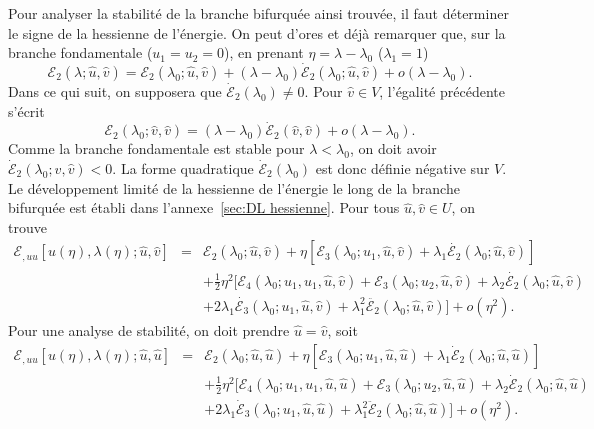 \documentclass{article}
\newcommand{\nobracket}{}
\newcommand{\nocomma}{}
\newcommand{\nosymbol}{}
\begin{document}
Pour analyser la stabilit{\'e} de la branche bifurqu{\'e}e ainsi trouv{\'e}e,
il faut d{\'e}terminer le signe de la hessienne de l'{\'e}nergie. On peut
d'ores et d{\'e}j{\`a} remarquer que, sur la branche fondamentale ($u_1 = u_2
= 0$), en prenant $\eta = \lambda - \lambda_0$ ($\lambda_1 = 1$)
\begin{equation}
  \mathcal{E}_2 (\lambda ; \hat{u}, \hat{v}) =\mathcal{E}_2 (\lambda_0 ;
  \hat{u}, \hat{v}) + (\lambda - \lambda_0)  \dot{\mathcal{E}}_2 (\lambda_0 ;
  \hat{u}, \hat{v}) + o (\lambda - \lambda_0) .
\end{equation}
Dans ce qui suit, on supposera que $\dot{\mathcal{E}}_2 (\lambda_0) \neq 0$.
Pour $\hat{v} \in V$, l'{\'e}galit{\'e} pr{\'e}c{\'e}dente s'{\'e}crit
\begin{equation}
  \mathcal{E}_2 (\lambda_0 ; \hat{v}, \hat{v}) = (\lambda - \lambda_0)
  \dot{\mathcal{E}}_2 (\hat{v}, \hat{v}) + o (\lambda - \lambda_0) .
\end{equation}
Comme la branche fondamentale est stable pour $\lambda < \lambda_0$, on doit
avoir $\dot{\mathcal{E}}_2 (\lambda_0 ; \hat{v}, \hat{v}) < 0$. La forme
quadratique $\dot{\mathcal{E}}_2 (\lambda_0)$ est donc d{\'e}finie
n{\'e}gative sur $V$. Le d{\'e}veloppement limit{\'e} de la hessienne de
l'{\'e}nergie le long de la branche bifurqu{\'e}e est {\'e}tabli dans
l'annexe~\ref{sec:DL hessienne}. Pour tous $\hat{u}, \hat{v} \in U$, on trouve
\begin{eqnarray}
  \mathcal{E}_{, u \nocomma u} [u (\eta), \lambda (\eta) ; \hat{u}, \hat{v}] &
  = & \mathcal{E}_2 (\lambda_0 ; \hat{u}, \hat{v}) + \eta [\mathcal{E}_3
  (\lambda_0 ; u_1, \hat{u}, \hat{v}) \nobracket \nobracket + \lambda_1
  \dot{\mathcal{E}_2} (\lambda_0 ; \hat{u}, \hat{v})] \nonumber\\
  &  & \nosymbol + \tfrac{1}{2} \eta^2  [\mathcal{E}_4 (\lambda_0 ; u_1, u_1,
  \hat{u}, \hat{v}) \nobracket +\mathcal{E}_3 (\lambda_0 ; u_2, \hat{u},
  \hat{v}) + \lambda_2  \dot{\mathcal{E}_2} (\lambda_0 ; \hat{u}, \hat{v})
  \nonumber\\
  &  & \nosymbol + 2 \lambda_1  \dot{\mathcal{E}_3} (\lambda_0 ; u_1,
  \hat{u}, \hat{v}) + \lambda_1^2  \ddot{\mathcal{E}_2} (\lambda_0 ; \hat{u},
  \hat{v}) \nobracket] + o (\eta^2) .  \label{eq:DL hessienne}
\end{eqnarray}
Pour une analyse de stabilit{\'e}, on doit prendre $\hat{u} = \hat{v}$, soit
\begin{eqnarray}
  \mathcal{E}_{, u \nocomma u} [u (\eta), \lambda (\eta) ; \hat{u}, \hat{u}] &
  = & \mathcal{E}_2 (\lambda_0 ; \hat{u}, \hat{u}) + \eta [\mathcal{E}_3
  (\lambda_0 ; u_1, \hat{u}, \hat{u}) + \lambda_1  \dot{\mathcal{E}}_2
  (\lambda_0 ; \hat{u}, \hat{u})] \nonumber\\
  &  & + \tfrac{1}{2} \eta^2  [\mathcal{E}_4 (\lambda_0 ; u_1, u_1, \hat{u},
  \hat{u}) +\mathcal{E}_3 (\lambda_0 ; u_2, \hat{u}, \hat{u}) + \lambda_2
  \dot{\mathcal{E}}_2 (\lambda_0 ; \hat{u}, \hat{u}) \nobracket \nonumber\\
  &  & + \nobracket 2 \lambda_1  \dot{\mathcal{E}}_3 (\lambda_0 ; u_1,
  \hat{u}, \hat{u}) + \lambda_1^2  \ddot{\mathcal{E}}_2 (\lambda_0 ; \hat{u},
  \hat{u})] + o (\eta^2) .  \label{eq:DL hessienne diag}
\end{eqnarray}
\end{document}
